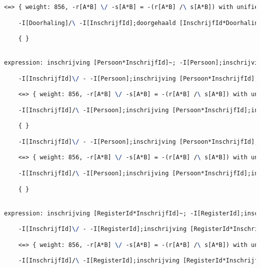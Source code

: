 \begin{lstlisting}[language=TeX]
    <=> { weight: 856, -r[A*B] \/ -s[A*B] = -(r[A*B] /\ s[A*B]) with unifier: {A->I[Doorhaling], B->I[Doorhaling], r->I[Doorhaling], s->doorgehaald [InschrijfId*Doorhaling]~;-I[InschrijfId];doorgehaald [InschrijfId*Doorhaling]} }

    -I[Doorhaling]/\ -I[InschrijfId];doorgehaald [InschrijfId*Doorhaling];doorgehaald [InschrijfId*Doorhaling]~

    { }


expression: inschrijving [Persoon*InschrijfId]~; -I[Persoon];inschrijving [Persoon*InschrijfId] |- -I[InschrijfId]

    -I[InschrijfId]\/ - -I[Persoon];inschrijving [Persoon*InschrijfId];inschrijving [Persoon*InschrijfId]~

    <=> { weight: 856, -r[A*B] \/ -s[A*B] = -(r[A*B] /\ s[A*B]) with unifier: {A->I[InschrijfId], B->I[InschrijfId], r->inschrijving [Persoon*InschrijfId]~;-I[Persoon];inschrijving [Persoon*InschrijfId], s->I[InschrijfId]} }

    -I[InschrijfId]/\ -I[Persoon];inschrijving [Persoon*InschrijfId];inschrijving [Persoon*InschrijfId]~

    { }

    -I[InschrijfId]\/ - -I[Persoon];inschrijving [Persoon*InschrijfId];inschrijving [Persoon*InschrijfId]~

    <=> { weight: 856, -r[A*B] \/ -s[A*B] = -(r[A*B] /\ s[A*B]) with unifier: {A->I[InschrijfId], B->I[InschrijfId], r->I[InschrijfId], s->inschrijving [Persoon*InschrijfId]~;-I[Persoon];inschrijving [Persoon*InschrijfId]} }

    -I[InschrijfId]/\ -I[Persoon];inschrijving [Persoon*InschrijfId];inschrijving [Persoon*InschrijfId]~

    { }


expression: inschrijving [RegisterId*InschrijfId]~; -I[RegisterId];inschrijving [RegisterId*InschrijfId] |- -I[InschrijfId]

    -I[InschrijfId]\/ - -I[RegisterId];inschrijving [RegisterId*InschrijfId];inschrijving [RegisterId*InschrijfId]~

    <=> { weight: 856, -r[A*B] \/ -s[A*B] = -(r[A*B] /\ s[A*B]) with unifier: {A->I[InschrijfId], B->I[InschrijfId], r->inschrijving [RegisterId*InschrijfId]~;-I[RegisterId];inschrijving [RegisterId*InschrijfId], s->I[InschrijfId]} }

    -I[InschrijfId]/\ -I[RegisterId];inschrijving [RegisterId*InschrijfId];inschrijving [RegisterId*InschrijfId]~


\end{lstlisting}
